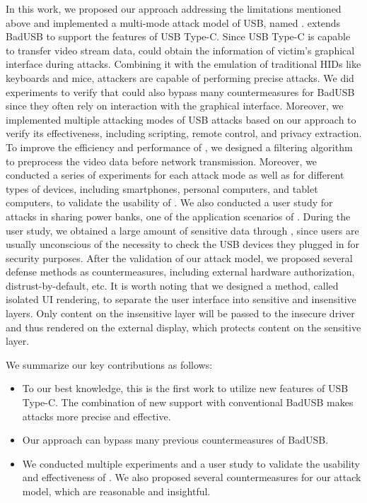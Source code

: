 In this work, we proposed our approach addressing the limitations mentioned
above and implemented a multi-mode attack model of USB, named \tool.  \tool
extends BadUSB to support the features of USB Type-C.  Since USB Type-C is
capable to transfer video stream data, \tool could obtain the information of
victim's graphical interface during attacks.  Combining it with the emulation
of traditional HIDs like keyboards and mice, attackers are capable of
performing precise attacks.  We did experiments to verify that \tool could also
bypass many countermeasures for BadUSB since they often rely on interaction
with the graphical interface.  Moreover, we implemented multiple attacking
modes of USB attacks based on our approach to verify its effectiveness,
including scripting, remote control, and privacy extraction.  To improve the
efficiency and performance of \tool, we designed a filtering algorithm to
preprocess the video data before network transmission.  Moreover, we conducted
a series of experiments for each attack mode as well as for different types of
devices, including smartphones, personal computers, and tablet computers, to
validate the usability of \tool.  We also conducted a user study for attacks in
sharing power banks, one of the application scenarios of \tool.  During the
user study, we obtained a large amount of sensitive data through \tool, since
users are usually unconscious of the necessity to check the USB devices they
plugged in for security purposes.  After the validation of our attack model, we
proposed several defense methods as countermeasures, including external
hardware authorization, distrust-by-default, etc.  It is worth noting that we
designed a method, called isolated UI rendering, to separate the user interface
into sensitive and insensitive layers.  Only content on the insensitive layer
will be passed to the insecure driver and thus rendered on the external
display, which protects content on the sensitive layer.

We summarize our key contributions as follows:

\begin{itemize} 
    
    \item To our best knowledge, this is the first work to utilize new features
	of USB Type-C.  The combination of new support with conventional BadUSB
	makes attacks more precise and effective.
	
    \item Our approach can bypass many previous countermeasures of BadUSB.
	
    \item We conducted multiple experiments and a user study to validate the
	usability and effectiveness of \tool.  We also proposed several
	countermeasures for our attack model, which are reasonable and
	insightful. 
\end{itemize}


